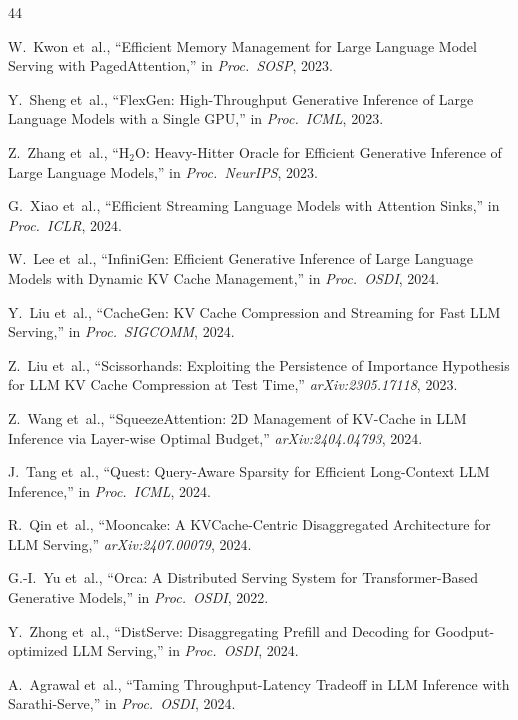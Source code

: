 \documentclass[conference]{IEEEtran}
\begin{document}
\balance

\begin{thebibliography}{44}

 W.~Kwon et~al., ``Efficient Memory Management for Large Language Model Serving with PagedAttention,'' in \textit{Proc.\ SOSP}, 2023.

 Y.~Sheng et~al., ``FlexGen: High-Throughput Generative Inference of Large Language Models with a Single GPU,'' in \textit{Proc.\ ICML}, 2023.

 Z.~Zhang et~al., ``H$_2$O: Heavy-Hitter Oracle for Efficient Generative Inference of Large Language Models,'' in \textit{Proc.\ NeurIPS}, 2023.

 G.~Xiao et~al., ``Efficient Streaming Language Models with Attention Sinks,'' in \textit{Proc.\ ICLR}, 2024.

 W.~Lee et~al., ``InfiniGen: Efficient Generative Inference of Large Language Models with Dynamic KV Cache Management,'' in \textit{Proc.\ OSDI}, 2024.

 Y.~Liu et~al., ``CacheGen: KV Cache Compression and Streaming for Fast LLM Serving,'' in \textit{Proc.\ SIGCOMM}, 2024.

 Z.~Liu et~al., ``Scissorhands: Exploiting the Persistence of Importance Hypothesis for LLM KV Cache Compression at Test Time,'' \textit{arXiv:2305.17118}, 2023.

 Z.~Wang et~al., ``SqueezeAttention: 2D Management of KV-Cache in LLM Inference via Layer-wise Optimal Budget,'' \textit{arXiv:2404.04793}, 2024.

 J.~Tang et~al., ``Quest: Query-Aware Sparsity for Efficient Long-Context LLM Inference,'' in \textit{Proc.\ ICML}, 2024.

 R.~Qin et~al., ``Mooncake: A KVCache-Centric Disaggregated Architecture for LLM Serving,'' \textit{arXiv:2407.00079}, 2024.

 G.-I.~Yu et~al., ``Orca: A Distributed Serving System for Transformer-Based Generative Models,'' in \textit{Proc.\ OSDI}, 2022.

 Y.~Zhong et~al., ``DistServe: Disaggregating Prefill and Decoding for Goodput-optimized LLM Serving,'' in \textit{Proc.\ OSDI}, 2024.

 A.~Agrawal et~al., ``Taming Throughput-Latency Tradeoff in LLM Inference with Sarathi-Serve,'' in \textit{Proc.\ OSDI}, 2024.


\end{thebibliography}
\end{document}
